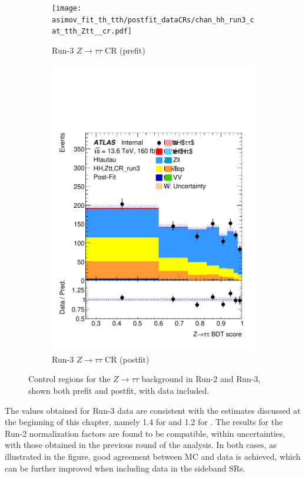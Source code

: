 \begin{figure}[h]
  \begin{subfigure}[t]{0.45\textwidth}
    \centering
    \texttt{[image: asimov\_fit\_th\_tth/postfit\_dataCRs/chan\_hh\_run3\_cat\_tth\_Ztt\_\_cr.pdf]}
    \caption{Run-3 $Z\to\tau\tau$ CR (prefit)}
  \end{subfigure}
  \hfill
  \begin{subfigure}[t]{0.45\textwidth}
    \centering
    \includegraphics[width=\linewidth]{images/asimov_fit_th_tth/postfit_dataCRs/chan_hh_run3_cat_tth_Ztt__cr_postFit.pdf}
    \caption{Run-3 $Z\to\tau\tau$ CR (postfit)}
  \end{subfigure}

  \caption{Control regions for the $Z\to\tau\tau$ background in Run-2 and Run-3, shown both prefit and postfit, with data included.}
  \label{fig:ztt_crs}
\end{figure}

The values obtained for Run-3 data are consistent with the estimates discussed at the beginning of this chapter, namely 1.4 for \ztautau and 1.2 for \ttbar. The results for the Run-2 normalization factors are found to be compatible, within uncertainties, with those obtained in the previous round of the analysis. In both cases, as illustrated in the figure, good agreement between MC and data is achieved, which can be further improved when including data in the sideband SRs.








